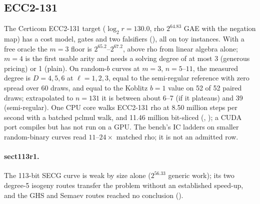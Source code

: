 \subsection{ECC2-131}

The Certicom ECC2-131 target ($\log_2 r=130.0$, rho $2^{64.83}$ GAE with the
negation map) has a cost model, gates and two falsifiers
(), all on toy instances. With a free
oracle the $m=3$ floor is $2^{65.2}$--$2^{67.2}$, above rho from linear
algebra alone; $m=4$ is the first usable arity and needs a solving degree of
at most 3 (generous pricing) or 1 (plain). On random-$b$ curves at $m=3$,
$n=5$--$11$, the measured degree is $D=4,5,6$ at $\ell=1,2,3$, equal to the
semi-regular reference with zero spread over 60 draws, and equal to the
Koblitz $b=1$ value on 52 of 52 paired draws; extrapolated to $n=131$ it is
between about 6--7 (if it plateaus) and 39 (semi-regular). One CPU core walks
ECC2-131 rho at 8.50 million steps per second with a batched pclmul walk, and
11.46 million bit-sliced (,
); a CUDA port compiles but
has not run on a GPU. The bench's IC ladders on smaller random-binary
curves read $11$--$24\times$ matched rho; it is not an admitted row.

\paragraph{sect113r1.} The 113-bit SECG curve is weak by size alone
($2^{56.33}$ generic work); its two degree-5 isogeny routes transfer the
problem without an established speed-up, and the GHS and Semaev routes
reached no conclusion ().
